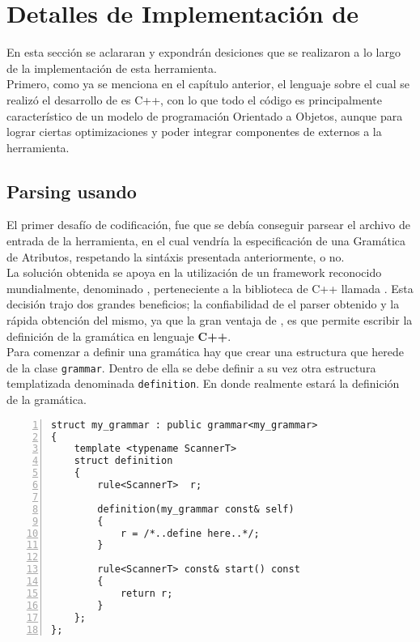 \chapter{Detalles de Implementaci\'on de \maggen}
\label{chap:implem}
\minitoc

En esta sección se aclararan y expondrán desiciones que se realizaron a lo largo de la implementación de esta herramienta.\\
Primero, como ya se menciona en el capítulo anterior, el lenguaje sobre el cual se realizó el desarrollo de \maggen es C++, con lo que todo el código es principalmente característico de un modelo de programación Orientado a Objetos, aunque para lograr ciertas optimizaciones y poder integrar componentes de externos a la herramienta.

\section{Parsing usando \boost \ \spirit}

El primer desafío de codificación, fue que se debía conseguir parsear el archivo de entrada de la herramienta, en el cual vendría la especificación de una Gramática de Atributos, respetando la sintáxis presentada anteriormente, o no.\\
La solución obtenida se apoya en la utilización de un framework reconocido mundialmente, denominado \spirit, perteneciente a la biblioteca de C++ llamada \boost. Esta decisión trajo dos grandes beneficios; la confiabilidad de el parser obtenido y la rápida obtención del mismo, ya que la gran ventaja de \spirit, es que permite escribir la definición de la gramática en lenguaje \textbf{C++}.\\
Para comenzar a definir una gramática hay que crear una estructura que herede de la clase \texttt{grammar}. Dentro de ella se debe definir a su vez otra estructura templatizada denominada \texttt{definition}. En donde realmente estará la definición de la gramática.\\

\begin{center}\lstset{language=C++}
\scriptsize
\begin{lstlisting}[frame=single,numbers=left]
struct my_grammar : public grammar<my_grammar>
{
    template <typename ScannerT>
    struct definition
    {
        rule<ScannerT>  r;

        definition(my_grammar const& self)
        {
            r = /*..define here..*/;
        }

        rule<ScannerT> const& start() const
        {
            return r;
        }
    };
};
\end{lstlisting}\end{center}

